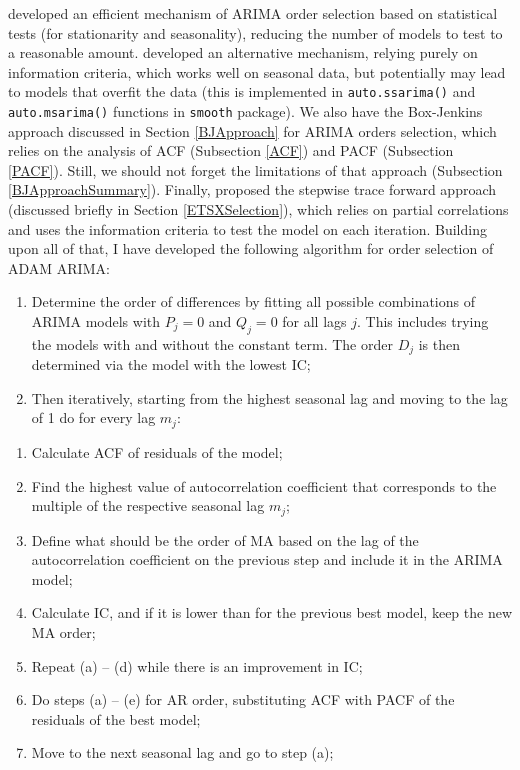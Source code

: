 \documentclass[
]{book}
\providecommand{\tightlist}{%
  \setlength{\itemsep}{0pt}\setlength{\parskip}{0pt}}
\theoremstyle{definition}
\theoremstyle{definition}
\theoremstyle{definition}
\theoremstyle{definition}
\theoremstyle{remark}
\begin{document}
\citet{Hyndman2008Forecast} developed an efficient mechanism of ARIMA order selection based on statistical tests (for stationarity and seasonality), reducing the number of models to test to a reasonable amount. \citet{Svetunkov2019} developed an alternative mechanism, relying purely on information criteria, which works well on seasonal data, but potentially may lead to models that overfit the data (this is implemented in \texttt{auto.ssarima()} and \texttt{auto.msarima()} functions in \texttt{smooth} package). We also have the Box-Jenkins approach discussed in Section \ref{BJApproach} for ARIMA orders selection, which relies on the analysis of ACF (Subsection \ref{ACF}) and PACF (Subsection \ref{PACF}). Still, we should not forget the limitations of that approach (Subsection \ref{BJApproachSummary}). Finally, \citet{Sagaert2021} proposed the stepwise trace forward approach (discussed briefly in Section \ref{ETSXSelection}), which relies on partial correlations and uses the information criteria to test the model on each iteration. Building upon all of that, I have developed the following algorithm for order selection of ADAM ARIMA:

\begin{enumerate}
\def\labelenumi{\arabic{enumi}.}
\tightlist
\item
  Determine the order of differences by fitting all possible combinations of ARIMA models with \(P_j=0\) and \(Q_j=0\) for all lags \(j\). This includes trying the models with and without the constant term. The order \(D_j\) is then determined via the model with the lowest IC;
\item
  Then iteratively, starting from the highest seasonal lag and moving to the lag of 1 do for every lag \(m_j\):
\end{enumerate}

\begin{enumerate}
\def\labelenumi{\alph{enumi}.}
\tightlist
\item
  Calculate ACF of residuals of the model;
\item
  Find the highest value of autocorrelation coefficient that corresponds to the multiple of the respective seasonal lag \(m_j\);
\item
  Define what should be the order of MA based on the lag of the autocorrelation coefficient on the previous step and include it in the ARIMA model;
\item
  Calculate IC, and if it is lower than for the previous best model, keep the new MA order;
\item
  Repeat (a) -- (d) while there is an improvement in IC;
\item
  Do steps (a) -- (e) for AR order, substituting ACF with PACF of the residuals of the best model;
\item
  Move to the next seasonal lag and go to step (a);
\end{enumerate}
\end{document}
